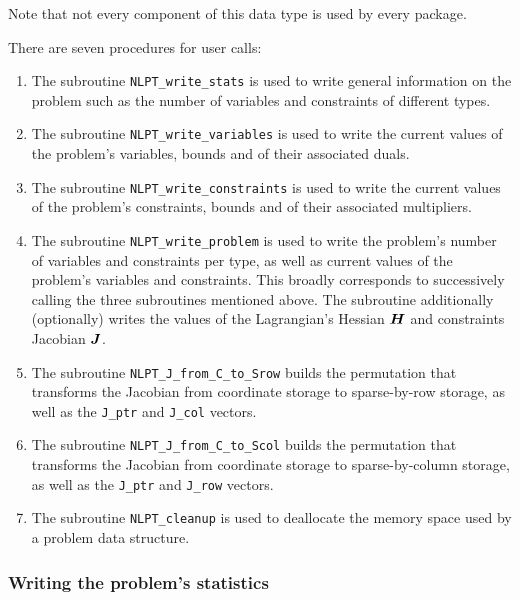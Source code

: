 \documentclass{galahad}
\newcommand{\packagename}{NLPT}
\begin{document}
\noindent
Note that not every component of this data type is used by every package.


\galarguments
There are seven procedures for user calls:

\begin{enumerate}
\item The subroutine {\tt \packagename\_write\_stats} 
      is used to write general information on the problem such
      as the number of variables and constraints of different types.
\item The subroutine {\tt \packagename\_write\_variables}
      is used to write the current values of the problem's variables, bounds
      and of their associated duals.
\item The subroutine {\tt \packagename\_write\_constraints}
      is used to write the current values of the problem's constraints, bounds
      and of their associated multipliers.
\item The subroutine {\tt \packagename\_write\_problem}
      is used to write the problem's number of variables and
      constraints per type, as well as current values of the problem's 
      variables and constraints. This broadly corresponds to successively 
      calling the three subroutines mentioned above. The subroutine
      additionally (optionally) writes the values of the Lagrangian's Hessian
      ${\bm{H}}$ and constraints Jacobian ${\bm{J}}$.
\item The subroutine {\tt \packagename\_J\_from\_C\_to\_Srow}
      builds the permutation that transforms the Jacobian from
      coordinate storage to sparse-by-row storage, as well as the
      {\tt J\_ptr} and {\tt J\_col} vectors.
\item The subroutine {\tt \packagename\_J\_from\_C\_to\_Scol}
      builds the permutation that transforms the Jacobian from
      coordinate storage to sparse-by-column storage, as well as the
      {\tt J\_ptr} and {\tt J\_row} vectors.
\item The subroutine {\tt \packagename\_cleanup} is used to deallocate
      the memory space used by a problem data structure.
\end{enumerate}

\subsubsection{Writing the problem's statistics}\label{w_stats}
\end{document}
